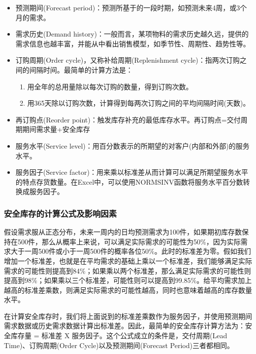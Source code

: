 \begin{itemize}
        \item  预测期间(Forecast period)：预测所基于的一段时期，如预测未来4周，或3个月的需求。

        \item  需求历史(Demand history)：一般而言，某项物料的需求历史越久远，提供的需求信息也越丰富，并能从中看出销售模型，如季节性、周期性、趋势性等。

        \item  订购周期(Order cycle)，又称补给周期(Replenishment cycle)：指两次订购之间的间隔时间。最简单的计算方法是：

        \begin{enumerate}
            \item  用全年的总用量除以每次订购的数量，得到订购次数。
            \item  用365天除以订购次数，计算得到每两次订购之间的平均间隔时间(天数)。
        \end{enumerate}

        \item  再订购点(Reorder point)：触发库存补充的最低库存水平。再订购点=交付周期期间需求量+安全库存

        \item  服务水平(Service level)：用百分数表示的所期望的对客户(内部和外部)的服务水平。

        \item  服务因子(Service factor)：用来乘以标准差从而计算可以满足所期望服务水平的特点存货数量。在Excel中，可以使用NORMSINV函数将服务水平百分数转换成服务因子。

    \end{itemize}

\subsubsection { 安全库存的计算公式及影响因素}

    假设需求服从正态分布，未来一周内的日均预测需求为100件，如果期初库存数保持在500件，那么从概率上来说，可以满足实际需求的可能性为50\%，因为实际需求大于一周500件或小于一周500件的概率各位50\%。此时的标准差为零。假如我们增加一个标准差，也就是在平均需求的基础上乘以一个标准差，我们能够满足实际需求的可能性则提高到84\%；如果乘以两个标准差，那么满足实际需求的可能性则提高到98\%；如果乘以三个标准差，可能性则可以提高到99.85\%。给平均需求加上越高的标准差乘数，则满足实际需求的可能性越高，同时也意味着越高的库存数量水平。

    在计算安全库存时，我们将上面说到的标准差乘数作为服务因子，并使用预测期间需求数据或历史需求数据计算出标准差。因此，最简单的安全库存计算方法为：安全库存量 = 标准差 X 服务因子。这个公式成立的条件是，交付周期(Lead Time)、订购周期(Order Cycle)以及预测期间(Forecast Period)三者都相同。

